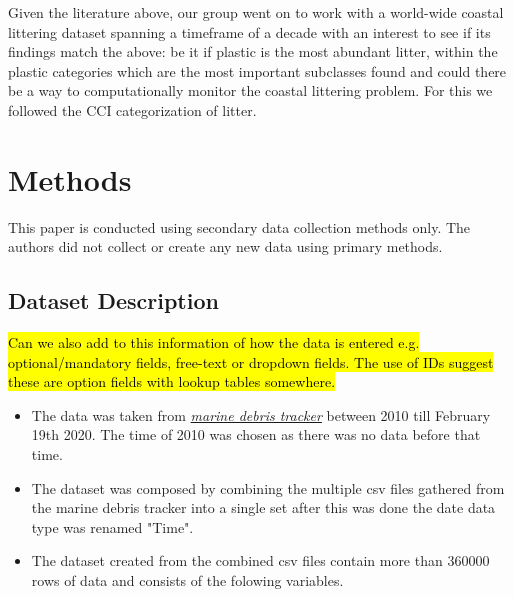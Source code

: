 \documentclass[10pt]{article}\usepackage[]{graphicx}\usepackage[]{color}
\begin{document}
Given the literature above, our group went on to work with a world-wide coastal littering dataset spanning a timeframe of a decade with an interest to see if its findings match the above: be it if plastic is the most abundant litter, within the plastic categories which are the most important subclasses found and could there be a way to computationally monitor the coastal littering problem. For this we followed the CCI categorization of litter.



\pagebreak
\section {Methods}\label{methods}

This paper is conducted using secondary data collection methods only. The authors did not collect or create any new data using primary methods.


\subsection{Dataset Description}\label{dataset}

\hl{Can we also add to this information of how the data is entered e.g. optional/mandatory fields, free-text or dropdown fields. The use of IDs suggest these are option fields with lookup tables somewhere.}

\begin{itemize}

\item The data was taken from  \textit{\href{http://marinedebris.engr.uga.edu/newmap/}{marine debris tracker}} between 2010 till February 19th 2020. The time of 2010 was chosen as there was no data before that time.
\item The dataset was composed by combining the multiple csv files gathered from the marine debris tracker into a single set after this was done the date data type was renamed "Time". 
\item The dataset created from the combined csv files contain more than 360000 rows of data and consists of the folowing variables. 
\end{itemize}
\end{document}
